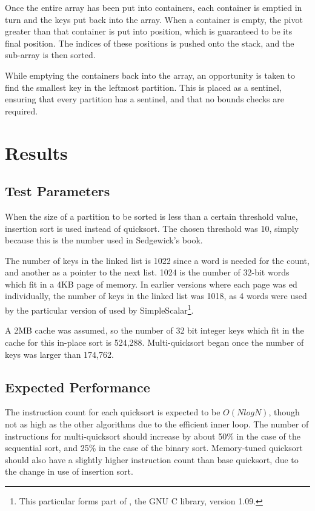 Once the entire array has been put into containers, each container is emptied
in turn and the keys put back into the array. When a container is empty, the
pivot greater than that container is put into position, which is guaranteed to
be its final position. The indices of these positions is pushed onto the
stack, and the sub-array is then sorted.

While emptying the containers back into the array, an opportunity is taken to
find the smallest key in the leftmost partition. This is placed as a sentinel,
ensuring that every partition has a sentinel, and that no bounds checks are
required.

\section{Results}

\subsection{Test Parameters}

When the size of a partition to be sorted is less than a certain
threshold value, insertion sort is used instead of quicksort. The
chosen threshold was 10, simply because this is the number used in
Sedgewick's book.

The number of keys in the linked list is 1022 since a word is needed for the
count, and another as a pointer to the next list. 1024 is the number of 32-bit
words which fit in a 4KB page of memory. In earlier versions where each page was
ed individually, the number of keys in the linked list was 1018,
as 4 words were used by the particular version of  used by
SimpleScalar\footnote{This particular  forms part of
, the GNU C library, version 1.09.}.

A 2MB cache was assumed, so the number of 32 bit integer keys which fit in the
cache for this in-place sort is 524,288. Multi-quicksort began once the number
of keys was larger than 174,762.

\subsection{Expected Performance}

The instruction count for each quicksort is expected to be $O(NlogN)$, though
not as high as the other algorithms due to the efficient inner loop. The number
of instructions for multi-quicksort should increase by about 50\% in the case of
the sequential sort, and 25\% in the case of the binary sort. Memory-tuned
quicksort should also have a slightly higher instruction count than base
quicksort, due to the change in use of insertion sort.

